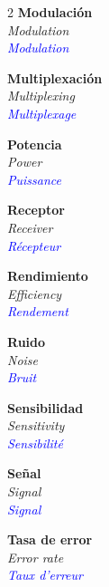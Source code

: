 \documentclass[a4paper,10pt]{article}
\begin{document}
\begin{multicols}{2}
\textbf{Modulaci\'on}\\
\textit{Modulation}\\
\textcolor{blue}{\textit{Modulation}}

\textbf{Multiplexaci\'on}\\
\textit{Multiplexing}\\
\textcolor{blue}{\textit{Multiplexage}}

\textbf{Potencia}\\
\textit{Power}\\
\textcolor{blue}{\textit{Puissance}}

\textbf{Receptor}\\
\textit{Receiver}\\
\textcolor{blue}{\textit{R\'ecepteur}}

\textbf{Rendimiento}\\
\textit{Efficiency}\\
\textcolor{blue}{\textit{Rendement}}

\textbf{Ruido}\\
\textit{Noise}\\
\textcolor{blue}{\textit{Bruit}}

\textbf{Sensibilidad}\\
\textit{Sensitivity}\\
\textcolor{blue}{\textit{Sensibilit\'e}}

\textbf{Se\~nal}\\
\textit{Signal}\\
\textcolor{blue}{\textit{Signal}}

\textbf{Tasa de error}\\
\textit{Error rate}\\
\textcolor{blue}{\textit{Taux d'erreur}}
\end{multicols}
\end{document}
